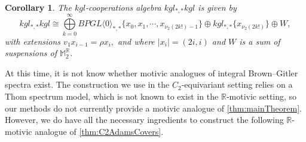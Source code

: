 \documentclass{amsart}
\newtheorem{cor}[equation]{Corollary}
\theoremstyle{plain}
\numberwithin{equation}{section}
\numberwithin{figure}{section}
\newcommand{\mM}{{\mathbb M}}
\newcommand{\mR}{{\mathbb R}}
\newcommand{\0}{\langle 0 \rangle }
\begin{document}
\begin{cor} \label{cor:kglcooperations}
    The $kgl$-cooperations algebra $kgl_{*,*} kgl$ is given by 
    \[
        kgl_{*,*} kgl \cong \bigoplus\limits_{k=0}^\infty BPGL \langle 0 \rangle_{*,*} \{ x_0, x_1, \cdots, x_{\nu_2 (2k!) - 1} \} \oplus kgl_{*, *} \{ x_{ \nu_2 (2k!)} \} \oplus W,
    \]
    with extensions $v_1 x_{i - 1} = \rho x_i,$ and where $\vert x_i \vert = (2i, i)$ and $W$ is a sum of suspensions of $\mM_2^\mR.$
\end{cor}

At this time, it is not know whether motivic analogues of integral Brown--Gitler spectra exist. The construction we use in the $C_{2}$-equivariant setting relies on a Thom spectrum model, which is not known to exist in the $\mR$-motivic setting, so our methods do not currently provide a motivic analogue of \cref{thm:mainTheorem}. However, we do have all the necessary ingredients to construct the following $\mR$-motivic analogue of \cref{thm:C2AdamsCovers}.
\end{document}
